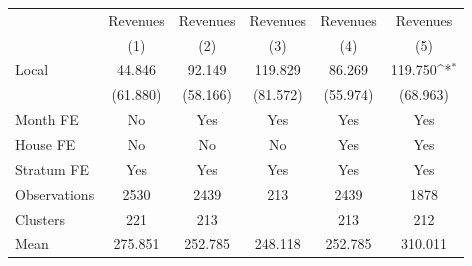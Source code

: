 {
\def\sym#1{\ifmmode^{#1}\else\(^{#1}\)\fi}
\begin{tabular}{l*{5}{c}}
\toprule
                &\multicolumn{1}{c}{Revenues}&\multicolumn{1}{c}{Revenues}&\multicolumn{1}{c}{Revenues}&\multicolumn{1}{c}{Revenues}&\multicolumn{1}{c}{Revenues}\\
                &\multicolumn{1}{c}{(1)}         &\multicolumn{1}{c}{(2)}         &\multicolumn{1}{c}{(3)}         &\multicolumn{1}{c}{(4)}         &\multicolumn{1}{c}{(5)}         \\
\midrule
Local           &   44.846         &   92.149         &  119.829         &   86.269         &  119.750\sym{*}  \\
                & (61.880)         & (58.166)         & (81.572)         & (55.974)         & (68.963)         \\
Month FE        &       No         &      Yes         &      Yes         &      Yes         &      Yes         \\
House FE        &       No         &       No         &       No         &      Yes         &      Yes         \\
Stratum FE      &      Yes         &      Yes         &      Yes         &      Yes         &      Yes         \\
\midrule
Observations    &     2530         &     2439         &      213         &     2439         &     1878         \\
Clusters        &      221         &      213         &                  &      213         &      212         \\
Mean            &  275.851         &  252.785         &  248.118         &  252.785         &  310.011         \\
\bottomrule
\end{tabular}
}
